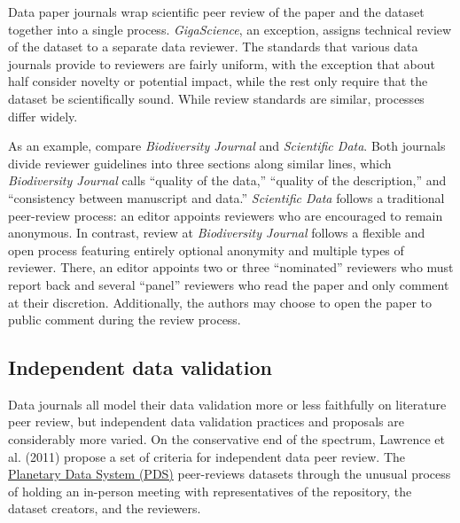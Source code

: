 \documentclass[10pt,a4paper,twocolumn]{article}
\begin{document}
{{Data paper journals wrap scientific peer review of the paper and the dataset together into a single process. 
\emph{GigaScience}, an exception, assigns technical review of the dataset to a separate data reviewer.
The standards that various data journals provide to reviewers are fairly uniform, with the exception that about half consider novelty or potential impact, while the rest only require that the dataset be scientifically sound.
While review standards are similar, processes differ widely. 

As an example, compare \emph{Biodiversity Journal} and \emph{Scientific Data}.
Both journals divide reviewer guidelines into three sections along similar lines, which \emph{Biodiversity Journal} calls ``quality of the data,'' ``quality of the description,'' and ``consistency between manuscript and data.''
\emph{Scientific Data} follows a traditional peer-review process: an editor appoints reviewers who are encouraged to remain anonymous.
In contrast, review at \emph{Biodiversity Journal} follows a flexible and open process featuring entirely optional anonymity and multiple types of reviewer.
There, an editor appoints two or three ``nominated'' reviewers who must report back and several ``panel'' reviewers who read the paper and only comment at their discretion.
Additionally, the authors may choose to open the paper to public comment during the review process.

\subsection*{Independent data validation}

Data journals all model their data validation more or less faithfully on literature peer review, but independent data validation practices and proposals are considerably more varied.
On the conservative end of the spectrum, Lawrence et al. (2011) propose a set of criteria for independent data peer review.\cite{lawrence_citation_2011}
The \href{https://pds.jpl.nasa.gov/}{Planetary Data System (PDS)} peer-reviews datasets through the unusual process of holding an in-person meeting with representatives of the repository, the dataset creators, and the reviewers.  

}}
\end{document}
